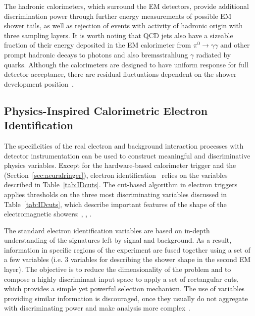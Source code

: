 The hadronic calorimeters, which surround the EM detectors,
provide additional discrimination power through further energy measurements of
possible EM shower tails, as well as rejection of events with activity of
hadronic origin with three sampling layers. It is worth noting that QCD jets also have a sizeable fraction of their energy deposited in the EM calorimeter from $\pi^{0}\rightarrow\gamma\gamma$
and other prompt hadronic decays to photons and also bremsstrahlung $\gamma$ radiated by quarks.
Although the calorimeters are designed 
to have uniform response for full detector acceptance, there are residual fluctuations 
dependent on the shower development position~\cite{Wigmans2017}.



\subsection{Physics-Inspired Calorimetric Electron Identification}\label{ssec:std_variables}

The specificities of the real electron and background interaction processes with
detector instrumentation can be used to construct meaningful and discriminative physics variables. Except for the hardware-based calorimeter trigger
and the \rnn (Section~\ref{sec:neuralringer}), electron
identification~\cite{atlas_electron_id_offline} relies on the variables
described in Table~\ref{tab:IDcuts}. 
The cut-based algorithm in electron
triggers applies thresholds on the three most discriminating variables discussed in Table~\ref{tab:IDcuts}, which describe important features of the shape of the electromagnetic showers: \reta{}, \eratio{}, \rhadone{}.




  
The standard electron identification variables are based on in-depth
understanding of the signatures left by signal and background.  As a result, information in specific regions of the experiment
are fused together using a set of a few variables (i.e. 3 variables for describing the shower shape in the second EM layer). The objective is to reduce the dimensionality of the problem and to compose a highly discriminant input space to apply a set of rectangular cuts, which provides a simple yet powerful selection mechanism. The use of variables providing similar information is discouraged, once they usually do not aggregate with
discriminating power and make analysis more
complex~\cite{aaboud2019electron}.

